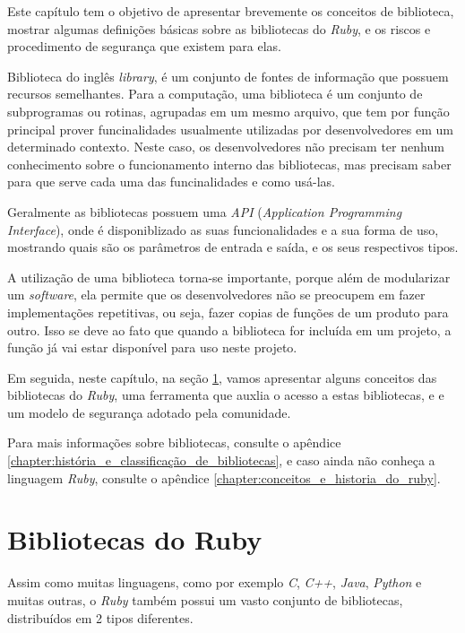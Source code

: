 Este capítulo tem o objetivo de apresentar brevemente os conceitos de biblioteca,
mostrar algumas definições básicas sobre as bibliotecas do \emph{Ruby}, e os riscos
e procedimento de segurança que existem para elas.

Biblioteca do inglês \emph{library}, é um conjunto de fontes de informação que possuem recursos
semelhantes. Para a computação, uma biblioteca é um conjunto de subprogramas ou
rotinas, agrupadas em um mesmo arquivo, que tem por função principal prover funcinalidades
usualmente utilizadas por desenvolvedores em um determinado contexto. Neste caso, os
desenvolvedores não precisam ter nenhum conhecimento sobre o funcionamento interno das
bibliotecas, mas precisam saber para que serve cada uma das funcinalidades e como usá-las.

Geralmente as bibliotecas possuem uma \emph{API} (\emph{Application Programming Interface}), onde
é disponiblizado as suas funcionalidades e a sua forma de uso, mostrando quais são os
parâmetros de entrada e saída, e os seus respectivos tipos.

A utilização de uma biblioteca torna-se importante, porque além de modularizar um \emph{software}, ela
permite que os desenvolvedores não se preocupem em fazer implementações repetitivas, ou seja, fazer
copias de funções de um produto para outro. Isso se deve ao fato que quando a biblioteca for
incluída em um projeto, a função já vai estar disponível para uso neste projeto.

Em seguida, neste capítulo, na seção \ref{section:bibliotecas_do_ruby}, vamos apresentar alguns
conceitos das bibliotecas do \emph{Ruby}, uma ferramenta que auxlia o acesso a estas bibliotecas, e
e um modelo de segurança adotado pela comunidade.

Para mais informações sobre bibliotecas, consulte o apêndice
\ref{chapter:história_e_classificação_de_bibliotecas}, e caso ainda não conheça a linguagem
\emph{Ruby}, consulte o apêndice \ref{chapter:conceitos_e_historia_do_ruby}.


\section{Bibliotecas do Ruby}
\label{section:bibliotecas_do_ruby}

Assim como muitas linguagens, como por exemplo \emph{C}, \emph{C++}, \emph{Java}, \emph{Python} e muitas
outras, o \emph{Ruby} também possui um vasto conjunto de bibliotecas, distribuídos em 2 tipos diferentes.

